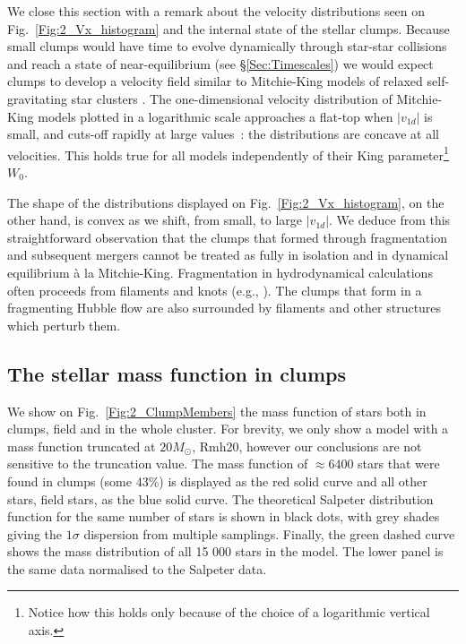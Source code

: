 We close this section with a remark about the velocity distributions seen on Fig.~\ref{Fig:2_Vx_histogram} and the internal state of the stellar clumps. Because small clumps would have time to evolve dynamically through star-star collisions and reach a state of near-equilibrium (see \S\ref{Sec:Timescales}) we would expect clumps to develop a velocity field similar to Mitchie-King models of  relaxed self-gravitating star clusters \citep{BT}.  The one-dimensional velocity distribution of Mitchie-King models plotted in a logarithmic scale approaches a flat-top when $|v_{1d}|$ is small,  and cuts-off rapidly at large values~: the distributions are  concave at all velocities. This holds true for all models independently of their King parameter\footnote{Notice how this holds only because of the choice of a logarithmic vertical axis.} $W_0$. 

The shape of the distributions displayed on Fig.~\ref{Fig:2_Vx_histogram}, on the other hand, is convex as we shift, from small, to large $|v_{1d}|$. We deduce from this straightforward observation that the clumps that formed through fragmentation and subsequent mergers cannot be treated as fully in isolation and in dynamical equilibrium \`a la Mitchie-King.  Fragmentation in hydrodynamical calculations often proceeds from filaments and knots  (e.g., \citealt{Klessen2001,MacLow2004,Maschberger2010,Bate2014}). The clumps that form in a fragmenting  Hubble  flow are also surrounded by filaments and other structures which perturb them.




\subsection{The stellar mass function in clumps} 



We show on Fig.~\ref{Fig:2_ClumpMembers} the mass function of stars both in clumps, field and in the whole cluster. For brevity, we only show a model with a mass function truncated at $20 M_\odot$, Rmh20,  however our conclusions are not sensitive to the truncation value. The mass function of $\approx 6400$ stars that were found in clumps (some 43\%) is displayed as the red solid curve and all other stars, field stars, as the blue solid curve. The theoretical Salpeter distribution function for the same number of stars is shown in black dots, with grey shades giving the  $1 \sigma$ dispersion from multiple samplings. Finally, the green dashed curve  shows the mass distribution of all 15 000 stars in the model. The lower panel is the same data normalised to the Salpeter data. 

